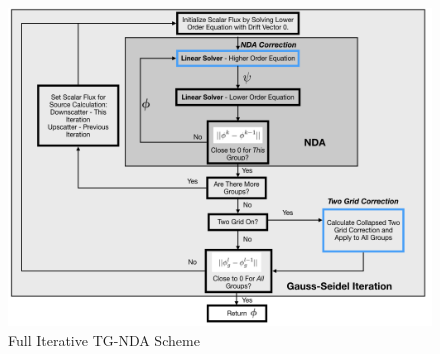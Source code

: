 \begin{figure}[H]
    \centering
    \includegraphics[width=\textwidth]{fig/TGNDAchart.png}
    \caption{Full Iterative TG-NDA Scheme}
    \label{fig:tgnda-graph}
\end{figure}